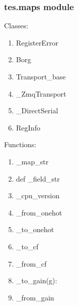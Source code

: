 \documentclass[letterpaper,10pt,english]{sphinxmanual}
\begin{document}
\subsubsection{tes.maps module}
\label{\detokenize{tes:module-tes.maps}}\label{\detokenize{tes:tes-maps-module}}
\sphinxAtStartPar
Classes:
\begin{enumerate}
%
\item {} 
\sphinxAtStartPar
RegisterError

\item {} 
\sphinxAtStartPar
Borg

\item {} 
\sphinxAtStartPar
Transport\_base

\item {} 
\sphinxAtStartPar
\_ZmqTransport

\item {} 
\sphinxAtStartPar
\_DirectSerial

\item {} 
\sphinxAtStartPar
RegInfo

\end{enumerate}

\sphinxAtStartPar
Functions:
\begin{enumerate}
%
\item {} 
\sphinxAtStartPar
\_map\_str

\item {} 
\sphinxAtStartPar
def \_field\_str

\item {} 
\sphinxAtStartPar
\_cpu\_version

\item {} 
\sphinxAtStartPar
\_from\_onehot

\item {} 
\sphinxAtStartPar
\_to\_onehot

\item {} 
\sphinxAtStartPar
\_to\_cf

\item {} 
\sphinxAtStartPar
\_from\_cf

\item {} 
\sphinxAtStartPar
\_to\_gain(g):

\item {} 
\sphinxAtStartPar
\_from\_gain

\end{enumerate}
\end{document}
